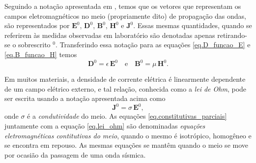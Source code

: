 Seguindo a nota\c{c}\~ao apresentada em \cite{erigen_1963}, temos que os vetores que representam os campos eletromagn\'eticos no meio (propriamente dito) de propaga\c{c}\~ao das ondas, s\~ao representados por $\mathbf{E}^0$, $\mathbf{D}^0$, $\mathbf{B}^0$, $\mathbf{H}^0$ e
$\mathbf{J}^0$. Essas mesmas quantidades, quando se referirem \`as medidas observadas em laborat\'orio s\~ao denotadas apenas retirando-se o sobrescrito $^0$. Transferindo essa nota\c{c}\~ao para as equa\c{c}\~oes \ref{eq.D_funcao_E} e \ref{eq.B_funcao_H} temos
\begin{equation}\label{eq.constitutivas_parciais}
\mathbf{D}^0=\epsilon\,\mathbf{E}^0\quad\text{e}\quad\mathbf{B}^0=\mu\,\mathbf{H}^0.
\end{equation}

Em muitos materiais, a densidade de corrente el\'etrica \'e linearmente dependente de um campo el\'etrico externo, e tal rela\c{c}\~ao, conhecida como a \textit{lei de Ohm}, pode ser escrita usando a nota\c{c}\~ao apresentada acima como
\begin{equation}\label{eq.lei_ohm}
\mathbf{J}^0=\sigma\,\mathbf{E}^0,
\end{equation}
onde $\sigma$ \'e a \textit{condutividade} do meio. As equa\c{c}\~oes \ref{eq.constitutivas_parciais} juntamente com a equa\c{c}\~ao \ref{eq.lei_ohm} s\~ao denominadas \textit{equa\c{c}\~oes eletromagn\'eticas contitutivas do meio}, quando o mesmo \'e isotr\'opico, homog\^eneo e se encontra em repouso. As mesmas equa\c{c}\~oes se mant\^em quando o meio se move por ocasi\~ao da passagem de uma onda s\'ismica. 


